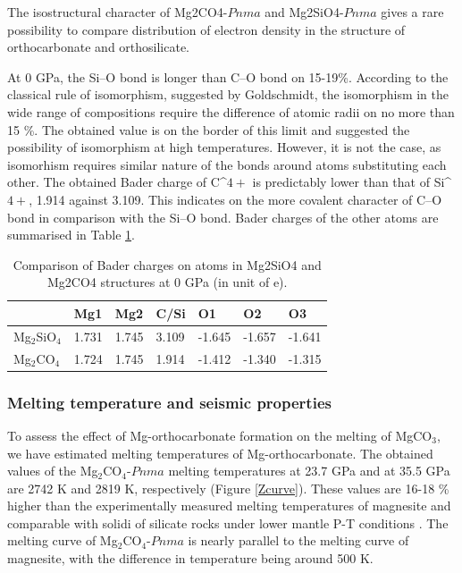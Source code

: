 \documentclass[a4paperm]{article}
\begin{document}
The isostructural character of Mg2CO4-$Pnma$ and Mg2SiO4-$Pnma$ gives a rare possibility to compare distribution of electron density in the structure of orthocarbonate and orthosilicate.

At 0 GPa, the Si--O bond is longer than C--O bond on 15-19\%.
According to the classical rule of isomorphism, suggested by Goldschmidt, the isomorphism in the wide range of compositions require the difference of atomic radii on no more than 15 \%.
The obtained value is on the border of this limit and suggested the possibility of isomorphism at high temperatures.
However, it is not the case, as isomorhism requires similar nature of the bonds around atoms substituting each other.
The obtained Bader charge of C^${4+}$ is predictably lower than that of Si^${4+}$, 1.914 against 3.109. 
This indicates on the more covalent character of C--O bond in comparison with the Si--O bond.
Bader charges of the other atoms are summarised in Table \ref{t:bader}.

\begin{table}[h] \centering
	\caption{Comparison of Bader charges on atoms in Mg2SiO4 and Mg2CO4 structures at 0 GPa (in unit of e).} \vspace{2mm} \label{t:bader}
	\begin{tabular}{l l l l l l l }
        &       Mg1     &       Mg2     &       C/Si    &       O1      &       O2      &       O3      \\
		\hline
Mg$_2$SiO$_4$ &       1.731   &       1.745   &       3.109   &       -1.645  &       -1.657  &       -1.641  \\
Mg$_2$CO$_4$  &       1.724   &       1.745   &       1.914   &       -1.412  &       -1.340  &       -1.315  \\
		\hline 


	\end{tabular}
\end{table}


\subsubsection*{Melting temperature and seismic properties}
To assess the effect of Mg-orthocarbonate formation on the melting of MgCO$_3$, we have estimated melting temperatures of Mg-orthocarbonate.
The obtained values of the Mg$_2$CO$_4$-$Pnma$ melting temperatures at 23.7 GPa and at 35.5 GPa are 2742 K and 2819 K, respectively (Figure \ref{Zcurve}).
These values are 16-18 \% higher than the experimentally measured melting temperatures of magnesite  and comparable with solidi of silicate rocks under lower mantle P-T conditions \cite{litasov2018_review}.
The melting curve of Mg$_2$CO$_4$-$Pnma$ is nearly parallel to the melting curve of magnesite, with the difference in temperature being around 500 K.
\end{document}
